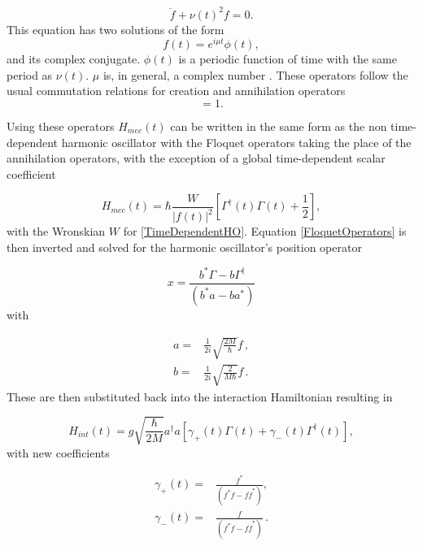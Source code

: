 \documentclass[reprint, amsmath,amssymb, aps,pra]{revtex4-1}
\begin{document}
\begin{equation} \label{TimeDependentHO}
\ddot{f} + \nu(t)^2f=0.
\end{equation} This equation has two solutions \cite{HanngiFM} of the form
\begin{equation}
f(t) = e^{i\mu t}\phi(t), 
\end{equation} and its complex conjugate. $\phi(t)$ is a periodic function of time with the same period as $\nu(t)$.  $\mu$ is, in general, a complex number \cite{WardFT}. These operators follow the usual commutation relations for creation and annihilation operators
\begin{equation}
[\Gamma(t)^\dagger,\Gamma(t)]=1.
\end{equation}

 Using these operators $H_{mec}(t)$ can be written in the same form as the non time-dependent harmonic oscillator with the Floquet operators taking the place of the annihilation operators, with the exception of a global time-dependent scalar coefficient  \cite{BrownPT}

\begin{equation}
H_{mec}(t) = \hbar\frac{W}{|f(t)|^2}\left[\Gamma^\dagger(t)\Gamma(t) + \frac{1}{2}\right],
\end{equation}
with the Wronskian $W$ for \eqref{TimeDependentHO}. Equation
\eqref{FloquetOperators} is then inverted and solved for the harmonic
oscillator's position operator \cite{TesisMaestria}

\begin{equation}
x = \frac{b^* \Gamma - b\Gamma^\dagger}{(b^*a-ba^*)}
\end{equation} with

\begin{align}
a =&  \frac{1}{2i}\sqrt{\frac{2M}{\hbar}}\dot{f}\, , \\
b =&  \frac{1}{2i}\sqrt{\frac{2}{M\hbar}}f\, .
\end{align}
These are then substituted back into the interaction Hamiltonian
resulting in

\begin{equation}
H_{int}(t) = g\sqrt{\frac{\hbar}{2M}}a^\dagger a[\gamma_+(t)\Gamma (t) +\gamma_-(t)\Gamma^\dagger (t)],
\end{equation} with new coefficients

\begin{align*}
\gamma_+(t)=&\frac{f^*}{(f^*\dot{f}-f\dot{f}^*)},\\
\gamma_-(t)=&\frac{f}{(f^*\dot{f}-f\dot{f}^*)}\, .
\end{align*} 
\end{document}
